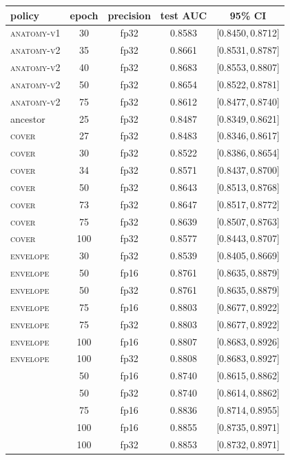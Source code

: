 \begin{tabular}{lcccc}
\toprule
policy & epoch & precision & test AUC & 95\% CI \\
\midrule
\textsc{anatomy-v1} & 30 & fp32 & 0.8583 & [0.8450,\,0.8712] \\
\textsc{anatomy-v2} & 35 & fp32 & 0.8661 & [0.8531,\,0.8787] \\
\textsc{anatomy-v2} & 40 & fp32 & 0.8683 & [0.8553,\,0.8807] \\
\textsc{anatomy-v2} & 50 & fp32 & 0.8654 & [0.8522,\,0.8781] \\
\textsc{anatomy-v2} & 75 & fp32 & 0.8612 & [0.8477,\,0.8740] \\
ancestor & 25 & fp32 & 0.8487 & [0.8349,\,0.8621] \\
\textsc{cover} & 27 & fp32 & 0.8483 & [0.8346,\,0.8617] \\
\textsc{cover} & 30 & fp32 & 0.8522 & [0.8386,\,0.8654] \\
\textsc{cover} & 34 & fp32 & 0.8571 & [0.8437,\,0.8700] \\
\textsc{cover} & 50 & fp32 & 0.8643 & [0.8513,\,0.8768] \\
\textsc{cover} & 73 & fp32 & 0.8647 & [0.8517,\,0.8772] \\
\textsc{cover} & 75 & fp32 & 0.8639 & [0.8507,\,0.8763] \\
\textsc{cover} & 100 & fp32 & 0.8577 & [0.8443,\,0.8707] \\
\textsc{envelope} & 30 & fp32 & 0.8539 & [0.8405,\,0.8669] \\
\textsc{envelope} & 50 & fp16 & 0.8761 & [0.8635,\,0.8879] \\
\textsc{envelope} & 50 & fp32 & 0.8761 & [0.8635,\,0.8879] \\
\textsc{envelope} & 75 & fp16 & 0.8803 & [0.8677,\,0.8922] \\
\textsc{envelope} & 75 & fp32 & 0.8803 & [0.8677,\,0.8922] \\
\textsc{envelope} & 100 & fp16 & 0.8807 & [0.8683,\,0.8926] \\
\textsc{envelope} & 100 & fp32 & 0.8808 & [0.8683,\,0.8927] \\
\ArmBest{} & 50 & fp16 & 0.8740 & [0.8615,\,0.8862] \\
\ArmBest{} & 50 & fp32 & 0.8740 & [0.8614,\,0.8862] \\
\ArmBest{} & 75 & fp16 & 0.8836 & [0.8714,\,0.8955] \\
\ArmBest{} & 100 & fp16 & 0.8855 & [0.8735,\,0.8971] \\
\ArmBest{} & 100 & fp32 & 0.8853 & [0.8732,\,0.8971] \\

\end{tabular}
